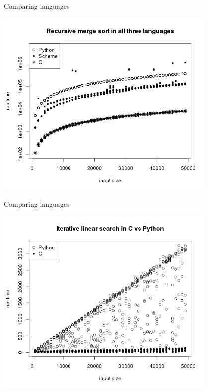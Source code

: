 \documentclass[]{beamer}
\begin{document}
\begin{frame}{Comparing languages}
\begin{center}
	\includegraphics[width=0.8\textwidth]{plots/recursive_merge_in_all_three_lgs.png}
\end{center}
\end{frame}

\begin{frame}[t]{Comparing languages}
\begin{center}
	\includegraphics[width=0.8\textwidth]{plots/i_linear_in_c_vs_python.png}
\end{center}
\end{frame}
\end{document}
